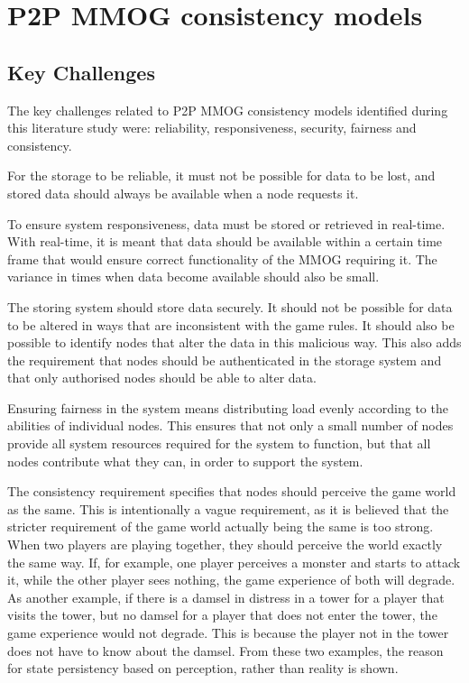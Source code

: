 \documentclass[journal,oneside,a4paper,onecolumn]{IEEEtran}
\begin{document}
\section{P2P MMOG consistency models}
\label{p2p_mmog_cm}

\subsection{Key Challenges}
\label{key_challenges_cm}

The key challenges related to P2P MMOG consistency models identified during this literature study were: reliability, responsiveness, security, fairness and consistency.

\begin{description}
\item[Reliability] For the storage to be reliable, it must not be possible for data to be lost, and stored data should always be available when a node requests it.
\item[Responsiveness] To ensure system responsiveness, data must be stored or retrieved in real-time. With real-time, it is meant that data should be available within a certain time frame that would ensure correct functionality of the MMOG requiring it. The variance in times when data become available should also be small.
\item[Security] The storing system should store data securely. It should not be possible for data to be altered in ways that are inconsistent with the game rules. It should also be possible to identify nodes that alter the data in this malicious way. This also adds the requirement that nodes should be authenticated in the storage system and that only authorised nodes should be able to alter data.
\item[Fairness] Ensuring fairness in the system means distributing load evenly according to the abilities of individual nodes. This ensures that not only a small number of nodes provide all system resources required for the system to function, but that all nodes contribute what they can, in order to support the system.
\item[Consistency] The consistency requirement specifies that nodes should perceive the game world as the same. This is intentionally a vague requirement, as it is believed that the stricter requirement of the game world actually being the same is too strong. When two players are playing together, they should perceive the world exactly the same way. If, for example, one player perceives a monster and starts to attack it, while the other player sees nothing, the game experience of both will degrade. As another example, if there is a damsel in distress in a tower for a player that visits the tower, but no damsel for a player that does not enter the tower, the game experience would not degrade. This is because the player not in the tower does not have to know about the damsel. From these two examples, the reason for state persistency based on perception, rather than reality is shown.
\end{description}
\end{document}
